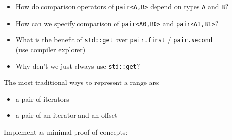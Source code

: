\documentclass[]{article}
\providecommand{\tightlist}{%
  \setlength{\itemsep}{0pt}\setlength{\parskip}{0pt}}
\begin{document}
\begin{itemize}
\tightlist
\item
  How do comparison operators of
  \texttt{pair\textless{}A,B\textgreater{}} depend on types \texttt{A}
  and \texttt{B}?

\item
  How can we specify comparison of
  \texttt{pair\textless{}A0,B0\textgreater{}} and
  \texttt{pair\textless{}A1,B1\textgreater{}}?
\item
  What is the benefit of \texttt{std::get} over \texttt{pair.first} /
  \texttt{pair.second}\\
   (use compiler explorer)
\item
  Why don't we just always use \texttt{std::get}?
\end{itemize}

The most traditional ways to represent a range are:

\begin{itemize}
\tightlist
\item
  a pair of iterators
\item
  a pair of an iterator and an offset
\end{itemize}

Implement as minimal proof-of-concepts:
\end{document}

